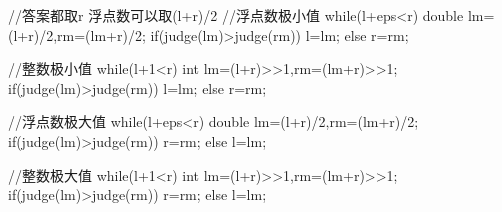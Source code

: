 //答案都取r 浮点数可以取(l+r)/2
//浮点数极小值
while(l+eps<r)
{
    double lm=(l+r)/2,rm=(lm+r)/2;
    if(judge(lm)>judge(rm)) l=lm;
    else r=rm;
}

//整数极小值
while(l+1<r)
{
    int lm=(l+r)>>1,rm=(lm+r)>>1;
    if(judge(lm)>judge(rm)) l=lm;
    else r=rm;
}

//浮点数极大值
while(l+eps<r)
{
    double lm=(l+r)/2,rm=(lm+r)/2;
    if(judge(lm)>judge(rm)) r=rm;
    else l=lm;
}

//整数极大值
while(l+1<r)
{
    int lm=(l+r)>>1,rm=(lm+r)>>1;
    if(judge(lm)>judge(rm)) r=rm;
    else l=lm;
}
